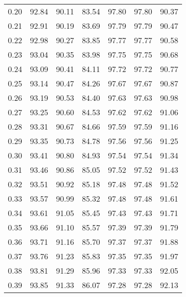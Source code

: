 \begin{tabular}{|c|c|c|c|c|c|c|}
      0.20 &     92.84 &     90.11 &      83.54 &   97.80 &      97.80 &         90.37 \\
      0.21 &     92.91 &     90.19 &      83.69 &   97.79 &      97.79 &         90.47 \\
      0.22 &     92.98 &     90.27 &      83.85 &   97.77 &      97.77 &         90.58 \\
      0.23 &     93.04 &     90.35 &      83.98 &   97.75 &      97.75 &         90.68 \\
      0.24 &     93.09 &     90.41 &      84.11 &   97.72 &      97.72 &         90.77 \\
      0.25 &     93.14 &     90.47 &      84.26 &   97.67 &      97.67 &         90.87 \\
      0.26 &     93.19 &     90.53 &      84.40 &   97.63 &      97.63 &         90.98 \\
      0.27 &     93.25 &     90.60 &      84.53 &   97.62 &      97.62 &         91.06 \\
      0.28 &     93.31 &     90.67 &      84.66 &   97.59 &      97.59 &         91.16 \\
      0.29 &     93.35 &     90.73 &      84.78 &   97.56 &      97.56 &         91.25 \\
      0.30 &     93.41 &     90.80 &      84.93 &   97.54 &      97.54 &         91.34 \\
      0.31 &     93.46 &     90.86 &      85.05 &   97.52 &      97.52 &         91.43 \\
      0.32 &     93.51 &     90.92 &      85.18 &   97.48 &      97.48 &         91.52 \\
      0.33 &     93.57 &     90.99 &      85.32 &   97.48 &      97.48 &         91.61 \\
      0.34 &     93.61 &     91.05 &      85.45 &   97.43 &      97.43 &         91.71 \\
      0.35 &     93.66 &     91.10 &      85.57 &   97.39 &      97.39 &         91.79 \\
      0.36 &     93.71 &     91.16 &      85.70 &   97.37 &      97.37 &         91.88 \\
      0.37 &     93.76 &     91.23 &      85.83 &   97.35 &      97.35 &         91.97 \\
      0.38 &     93.81 &     91.29 &      85.96 &   97.33 &      97.33 &         92.05 \\
      0.39 &     93.85 &     91.33 &      86.07 &   97.28 &      97.28 &         92.13 \\

\end{tabular}
